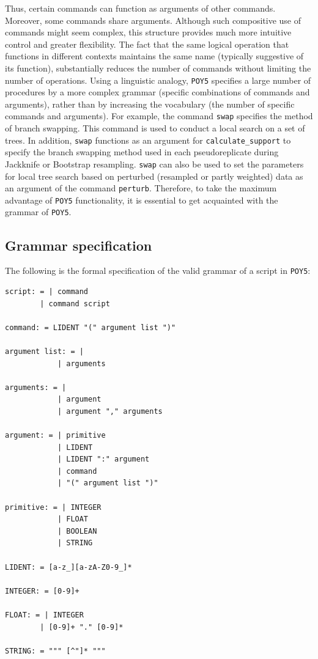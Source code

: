 \documentclass[11pt]{book}
\newcommand{\commandstyle}[1]{\texttt{#1}}
\newcommand{\poycommand}[1]{\commandstyle{#1}}
\newcommand{\poy}{\commandstyle{POY5}\xspace}
\begin{document}
Thus, certain commands can function as arguments of other commands. Moreover,
some commands share arguments. Although such compositive use of commands
might seem complex, this structure provides much more intuitive
control and greater flexibility. The fact that the same logical operation that functions
in different contexts maintains
the same name (typically suggestive of its function), substantially reduces the number of
commands without limiting the number of operations. Using a linguistic analogy,
\poy specifies a large number of procedures by a more complex grammar (specific
combinations of commands and arguments), rather than by increasing the vocabulary
(the number of specific commands and arguments). For example, the command
\poycommand{swap} specifies the method of branch swapping. This command is
used to conduct a local search on a set of trees. In addition,
\poycommand{swap} functions as an argument for \poycommand{calculate\_support}
to specify the branch swapping method used in each pseudoreplicate during Jackknife or
Bootstrap resampling. \poycommand{swap} can also be used to set the parameters for
local tree search based on perturbed (resampled or partly weighted) data as an argument
of the command \poycommand{perturb}. Therefore, to take the maximum advantage of
\poy functionality, it is essential to get acquainted with the grammar of  \poy.

\subsection{Grammar specification}

The following is the formal specification of the valid grammar of a script in \poy:

\begin{verbatim}
script: = | command
        | command script

command: = LIDENT "(" argument list ")"

argument list: = |
            | arguments

arguments: = |
            | argument
            | argument "," arguments

argument: = | primitive
            | LIDENT
            | LIDENT ":" argument
            | command
            | "(" argument list ")"

primitive: = | INTEGER
            | FLOAT
            | BOOLEAN
            | STRING

LIDENT: = [a-z_][a-zA-Z0-9_]*

INTEGER: = [0-9]+

FLOAT: = | INTEGER
        | [0-9]+ "." [0-9]*

STRING: = """ [^"]* """

\end{verbatim}
\end{document}
